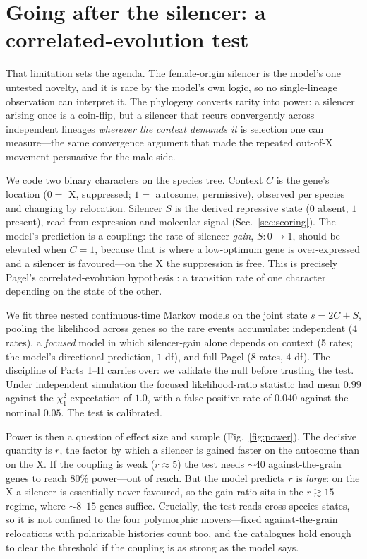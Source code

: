 \documentclass[11pt,a4paper]{article}
\begin{document}
\section{Going after the silencer: a correlated-evolution test}

That limitation sets the agenda. The female-origin silencer is the model's one untested novelty, and it is rare by the model's own logic, so no single-lineage observation can interpret it. The phylogeny converts rarity into power: a silencer arising once is a coin-flip, but a silencer that recurs convergently across independent lineages \emph{wherever the context demands it} is selection one can measure---the same convergence argument that made the repeated out-of-X movement persuasive for the male side.

We code two binary characters on the species tree. Context $C$ is the gene's location ($0=$ X, suppressed; $1=$ autosome, permissive), observed per species and changing by relocation. Silencer $S$ is the derived repressive state ($0$ absent, $1$ present), read from expression and molecular signal (Sec.~\ref{sec:scoring}). The model's prediction is a coupling: the rate of silencer \emph{gain}, $S{:}0{\to}1$, should be elevated when $C=1$, because that is where a low-optimum gene is over-expressed and a silencer is favoured---on the X the suppression is free. This is precisely Pagel's correlated-evolution hypothesis \citep{pagel1994}: a transition rate of one character depending on the state of the other.

We fit three nested continuous-time Markov models on the joint state $s=2C+S$, pooling the likelihood across genes so the rare events accumulate: independent (4 rates), a \emph{focused} model in which silencer-gain alone depends on context (5 rates; the model's directional prediction, $1$ df), and full Pagel (8 rates, $4$ df). The discipline of Parts~I--II carries over: we validate the null before trusting the test. Under independent simulation the focused likelihood-ratio statistic had mean $0.99$ against the $\chi^2_1$ expectation of $1.0$, with a false-positive rate of $0.040$ against the nominal $0.05$. The test is calibrated.

Power is then a question of effect size and sample (Fig.~\ref{fig:power}). The decisive quantity is $r$, the factor by which a silencer is gained faster on the autosome than on the X. If the coupling is weak ($r\approx 5$) the test needs $\sim\!40$ against-the-grain genes to reach $80\%$ power---out of reach. But the model predicts $r$ is \emph{large}: on the X a silencer is essentially never favoured, so the gain ratio sits in the $r\gtrsim 15$ regime, where $\sim\!8$--$15$ genes suffice. Crucially, the test reads cross-species states, so it is not confined to the four polymorphic movers---fixed against-the-grain relocations with polarizable histories count too, and the catalogues hold enough to clear the threshold if the coupling is as strong as the model says.
\end{document}
